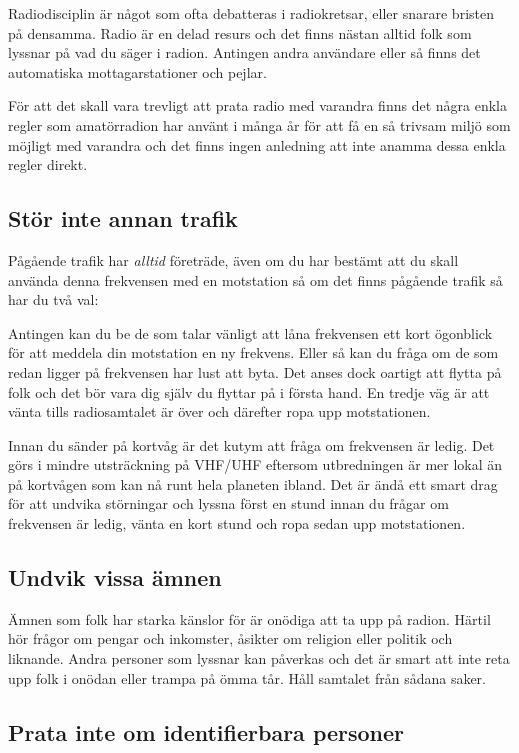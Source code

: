 Radiodisciplin är något som ofta debatteras i radiokretsar, eller snarare bristen på densamma. Radio är en delad resurs och det finns nästan alltid folk som lyssnar på vad du säger i radion. Antingen andra användare eller så finns det automatiska mottagarstationer och pejlar.

För att det skall vara trevligt att prata radio med varandra finns det några enkla regler som amatörradion har använt i många år för att få en så trivsam miljö som möjligt med varandra och det finns ingen anledning att inte anamma dessa enkla regler direkt.

\subsection{Stör inte annan trafik}

Pågående trafik har \textit{alltid} företräde, även om du har bestämt att du skall använda denna frekvensen med en motstation så om det finns pågående trafik så har du två val:

Antingen kan du be de som talar vänligt att låna frekvensen ett kort ögonblick för att meddela din motstation en ny frekvens. Eller så kan du fråga om de som redan ligger på frekvensen har lust att byta. Det anses dock oartigt att flytta på folk och det bör vara dig själv du flyttar på i första hand. En tredje väg är att vänta tills radiosamtalet är över och därefter ropa upp motstationen.

Innan du sänder på kortvåg är det kutym att fråga om frekvensen är ledig. Det görs i mindre utsträckning på VHF/UHF eftersom utbredningen är mer lokal än på kortvågen som kan nå runt hela planeten ibland. Det är ändå ett smart drag för att undvika störningar och lyssna först en stund innan du frågar om frekvensen är ledig, vänta en kort stund och ropa sedan upp motstationen.

\subsection{Undvik vissa ämnen}

Ämnen som folk har starka känslor för är onödiga att ta upp på radion. Härtil hör frågor om pengar och inkomster, åsikter om religion eller politik och liknande. Andra personer som lyssnar kan påverkas och det är smart att inte reta upp folk i onödan eller trampa på ömma tår. Håll samtalet från sådana saker.

\subsection{Prata inte om identifierbara personer}

